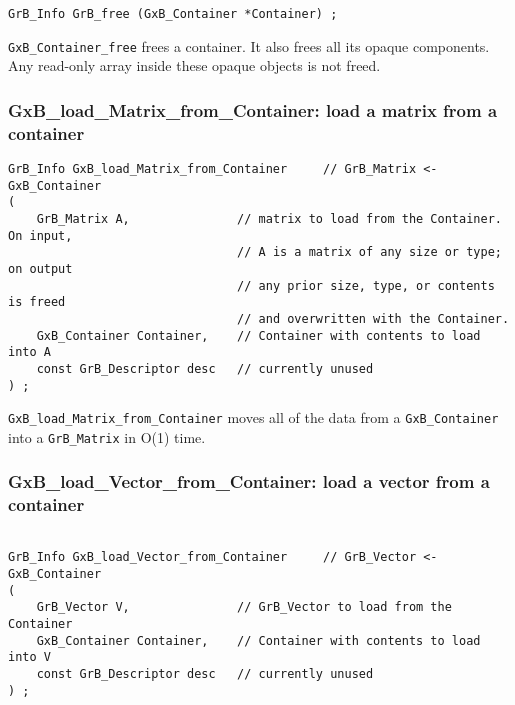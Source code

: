 \begin{mdframed}[userdefinedwidth=6in]
{\footnotesize
\begin{verbatim}
GrB_Info GrB_free (GxB_Container *Container) ;
\end{verbatim}
} \end{mdframed}

\verb'GxB_Container_free' frees a container.  It also frees all its opaque
components.  Any read-only array inside these opaque objects is not freed.

\newpage
\subsubsection{{\sf GxB\_load\_Matrix\_from\_Container:} load a matrix from a container}
\label{load_matrix_from_container}

\begin{mdframed}[userdefinedwidth=6in]
{\footnotesize
\begin{verbatim}
GrB_Info GxB_load_Matrix_from_Container     // GrB_Matrix <- GxB_Container
(
    GrB_Matrix A,               // matrix to load from the Container.  On input,
                                // A is a matrix of any size or type; on output
                                // any prior size, type, or contents is freed
                                // and overwritten with the Container.
    GxB_Container Container,    // Container with contents to load into A
    const GrB_Descriptor desc   // currently unused
) ;
\end{verbatim}
} \end{mdframed}

\verb'GxB_load_Matrix_from_Container' moves all of the data from a
\verb'GxB_Container' into a \verb'GrB_Matrix' in O(1) time.

\subsubsection{{\sf GxB\_load\_Vector\_from\_Container:} load a vector from a container}
\label{load_vector_from_container}

\begin{mdframed}[userdefinedwidth=6in]
{\footnotesize
\begin{verbatim}

GrB_Info GxB_load_Vector_from_Container     // GrB_Vector <- GxB_Container
(
    GrB_Vector V,               // GrB_Vector to load from the Container
    GxB_Container Container,    // Container with contents to load into V
    const GrB_Descriptor desc   // currently unused
) ;
\end{verbatim}
} \end{mdframed}

